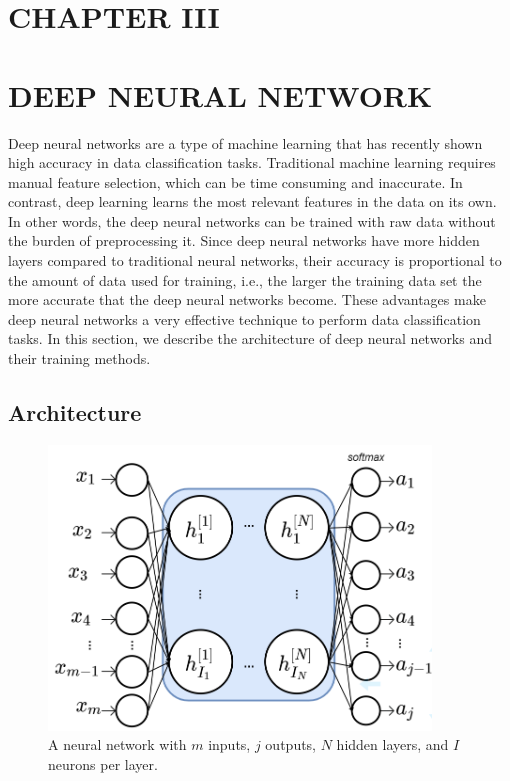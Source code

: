 \documentclass[letterpaper]{article}
\begin{document}
\begin{flushleft}
{\pagebreak
\section*{CHAPTER III}
\vspace{0.25in}
\section{DEEP NEURAL NETWORK}
Deep neural networks are a type of machine learning that has recently shown high accuracy in data classification tasks. Traditional
machine learning requires manual feature selection, which can be time consuming and inaccurate. In contrast, deep learning
learns the most relevant features in the data on its own. In other words, the deep neural networks can be trained with raw data without
the burden of preprocessing it. Since deep neural networks have more hidden layers compared to traditional neural networks, their
accuracy is proportional to the amount of data used for training, i.e., the larger the training data set the more accurate that the
deep neural networks become. These advantages make deep neural networks a very effective technique to perform data classification
tasks. In this section, we describe the architecture of deep neural networks and their training methods. 
 



\subsection{Architecture}\label{sec:MLP}

\begin{figure}[H]
  \centering
    \includegraphics[width=4in]{SimpleNN.png}
    \caption[A simple neural network.]{\label{fig:SimplNN} A neural network with $m$ inputs, $j$ outputs, $N$  hidden layers, and $I$ neurons per layer.}
  \end{figure}

}
\end{flushleft}
\end{document}
